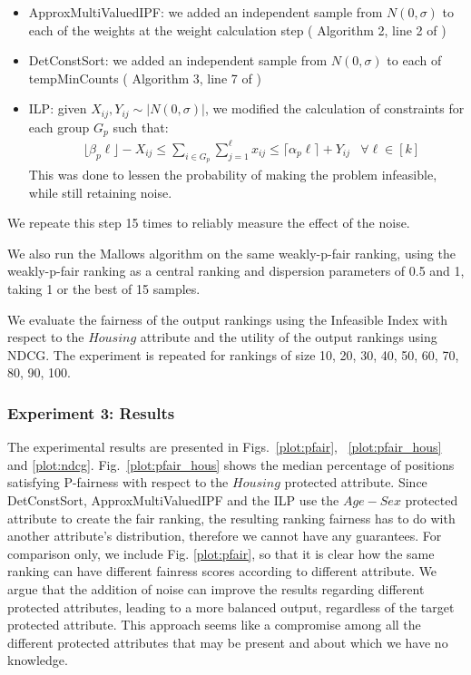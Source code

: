\begin{itemize}
    \item ApproxMultiValuedIPF: we added an independent sample from $N(0,\sigma)$ to each of the weights at the weight calculation step ( Algorithm 2, line 2 of \cite{RAPF})
    \item DetConstSort: we added an independent sample from $N(0,\sigma)$ to each of tempMinCounts ( Algorithm 3, line 7 of \cite{linkedin})
    \item ILP: given $X_{ij}, Y_{ij} \sim |N(0,\sigma)|$, we modified the calculation of constraints for each group $G_p$ such that:
    \begin{align*}
    & \lfloor \beta_p \ell \rfloor - X_{ij} \leq \sum_{i \in G_p} \sum_{j = 1}^\ell x_{ij}  \leq \lceil \alpha_p \ell \rceil + Y_{ij} & \forall \ell \in [k]
    \end{align*}
    This was done to lessen the probability of making the problem infeasible, while still retaining noise.
\end{itemize}
We repeate this step 15 times to reliably measure the effect of the noise.

We also run the Mallows algorithm on the same weakly-p-fair ranking, using the weakly-p-fair ranking as a central ranking and dispersion parameters of 0.5 and 1, taking 1 or the best of 15 samples.

We evaluate the fairness of the output rankings using the Infeasible Index with respect to the $Housing$ attribute and the utility of the output rankings using NDCG.
The experiment is repeated for rankings of size {10, 20, 30, 40, 50, 60, 70, 80, 90, 100}.

\subsubsection{Experiment 3: Results}

The experimental results are presented in Figs.~\ref{plot:pfair}, ~\ref{plot:pfair_hous} and \ref{plot:ndcg}. 
Fig.~\ref{plot:pfair_hous} shows the median percentage of positions satisfying P-fairness with respect to the $Housing$ protected attribute. Since DetConstSort,  ApproxMultiValuedIPF and the ILP use the $Age-Sex$ protected attribute to create the fair ranking, the resulting ranking fairness has to do with another attribute's distribution, therefore we cannot have any guarantees.  For comparison only, we include Fig. \ref{plot:pfair}, so that it is clear how the same ranking can have different fainress scores according to different attribute. We argue that the addition of noise can improve the results regarding different protected attributes, leading to a more balanced output, regardless of the target protected attribute. This approach seems like a compromise among all the different protected attributes that may be present and about which we have no knowledge.

